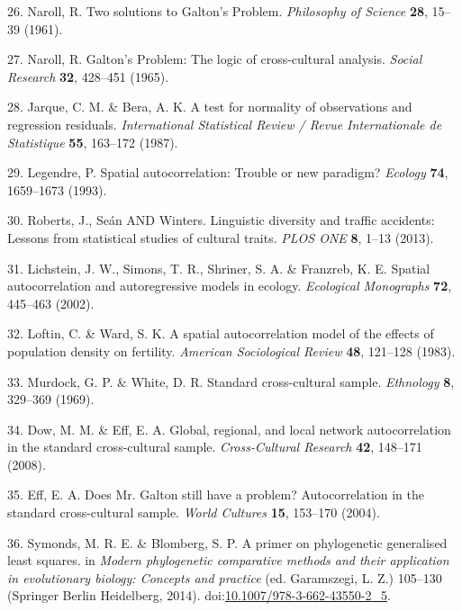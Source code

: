 \documentclass[english,man,floatsintext]{apa6}
\begin{document}
\leavevmode\hypertarget{ref-Naroll1961}{}%
26. Naroll, R. Two solutions to Galton's Problem. \emph{Philosophy of Science} \textbf{28}, 15--39 (1961).

\leavevmode\hypertarget{ref-Naroll1965}{}%
27. Naroll, R. Galton's Problem: The logic of cross-cultural analysis. \emph{Social Research} \textbf{32}, 428--451 (1965).

\leavevmode\hypertarget{ref-Jarque1987}{}%
28. Jarque, C. M. \& Bera, A. K. A test for normality of observations and regression residuals. \emph{International Statistical Review / Revue Internationale de Statistique} \textbf{55}, 163--172 (1987).

\leavevmode\hypertarget{ref-Legendre1993}{}%
29. Legendre, P. Spatial autocorrelation: Trouble or new paradigm? \emph{Ecology} \textbf{74}, 1659--1673 (1993).

\leavevmode\hypertarget{ref-Roberts2013}{}%
30. Roberts, J., Seán AND Winters. Linguistic diversity and traffic accidents: Lessons from statistical studies of cultural traits. \emph{PLOS ONE} \textbf{8}, 1--13 (2013).

\leavevmode\hypertarget{ref-Lichstein2002}{}%
31. Lichstein, J. W., Simons, T. R., Shriner, S. A. \& Franzreb, K. E. Spatial autocorrelation and autoregressive models in ecology. \emph{Ecological Monographs} \textbf{72}, 445--463 (2002).

\leavevmode\hypertarget{ref-Loftin1983}{}%
32. Loftin, C. \& Ward, S. K. A spatial autocorrelation model of the effects of population density on fertility. \emph{American Sociological Review} \textbf{48}, 121--128 (1983).

\leavevmode\hypertarget{ref-Murdock1969}{}%
33. Murdock, G. P. \& White, D. R. Standard cross-cultural sample. \emph{Ethnology} \textbf{8}, 329--369 (1969).

\leavevmode\hypertarget{ref-Dow2008}{}%
34. Dow, M. M. \& Eff, E. A. Global, regional, and local network autocorrelation in the standard cross-cultural sample. \emph{Cross-Cultural Research} \textbf{42}, 148--171 (2008).

\leavevmode\hypertarget{ref-Eff2004}{}%
35. Eff, E. A. Does Mr. Galton still have a problem? Autocorrelation in the standard cross-cultural sample. \emph{World Cultures} \textbf{15}, 153--170 (2004).

\leavevmode\hypertarget{ref-Symonds2014}{}%
36. Symonds, M. R. E. \& Blomberg, S. P. A primer on phylogenetic generalised least squares. in \emph{Modern phylogenetic comparative methods and their application in evolutionary biology: Concepts and practice} (ed. Garamszegi, L. Z.) 105--130 (Springer Berlin Heidelberg, 2014). doi:\href{https://doi.org/10.1007/978-3-662-43550-2_5}{10.1007/978-3-662-43550-2\_5}.
\end{document}
